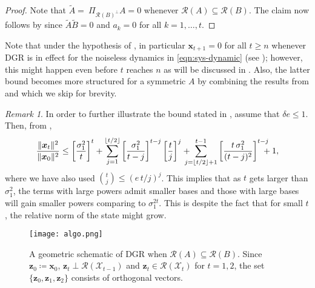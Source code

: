 \documentclass[journal]{IEEEtran}
\theoremstyle{definition}
\theoremstyle{remark}
\newtheorem{remark}{Remark}
\newcommand\x{{\bm x}}
\newcommand\z{{\bm z}}
\begin{document}
	\begin{proof} 
    	Note that $\widetilde{A} = ~\Pi_{\mathcal{R}(B)^\perp} A = 0$ whenever $\mathcal{R}(A) \subseteq \mathcal{R}(B)$.
    	The claim now follows by  since $\widetilde{A}\widetilde{B} = 0$ and $a_k = 0$ for all $k = 1, \dots, t$.
	\end{proof}
	
	{\color{PineGreen} Note that under the hypothesis of , in particular $\x_{t+1} = 0$ for all $t \geq n$ whenever \ac{DGR} is in effect for the noiseless dynamics in \cref{eqn:sys-dynamic} (see ); however, this might happen even before $t$ reaches $n$ as will be discussed in .}
	Also, the latter bound becomes more structured for a symmetric $A$ by combining the results from  and  which we skip for brevity.
	
	\begin{remark}\label{rem:simple-upperbound}
		In order to further illustrate the bound stated in , assume that $\delta e \leq 1$.
		Then, from ,
		\begin{gather*}
    	\frac{\|\x_t\|^2}{\|\x_0\|^2} \leq \left[\frac{\sigma_1^2}{t}\right]^t + \sum\limits_{j=1}^{\lfloor t/2 \rfloor} \left[\frac{\sigma_1^2 }{t-j} \right]^{t-j}\left[\frac{t}{j}\right]^j
    		+ \hspace{-0.3cm} \sum\limits_{j=\lfloor t/2 \rfloor + 1}^{t-1} \left[\frac{t \, \sigma_1^2 }{(t-j)^2} \right]^{t-j} \hspace{-0.3cm} +1,
		\end{gather*}
		\noindent where we have also used $\binom t j \leq (e \, t/j)^j$.
		This implies that as $t$ gets larger than $\sigma_1^2$, the terms with large powers admit smaller bases and those with large bases will gain smaller powers comparing to $\sigma_1^{2t}$.
		This is despite the fact that for small $t$, the relative norm of the state might grow.
	\end{remark}{}
	
	\begin{figure}
		\centering
		\texttt{[image: algo.png]}
		\caption{A geometric schematic of \ac{DGR} when $\mathcal{R}(A) \subseteq \mathcal{R}(B)$. Since $\z_0\coloneqq \x_0$, $\z_t\perp \mathcal{R}(\mathcal{X}_{t-1})$ and $\z_{t}\in\mathcal{R}(\mathcal{X}_{t})$ for $t=1,2$, the set $\{\z_0,\z_1,\z_2\}$ consists of orthogonal vectors.}
		\label{fig:algo}
		\vspace{-0.3cm}
	\end{figure}
	
\end{document}
